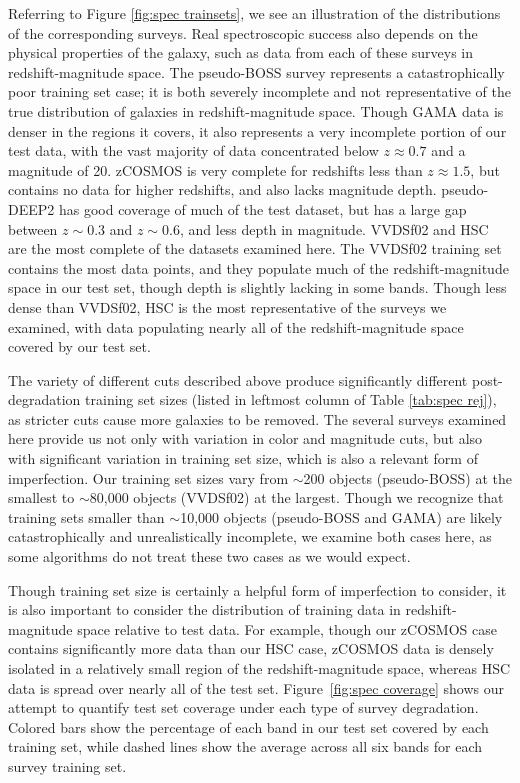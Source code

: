 \documentclass[fleqn,usenatbib,useAMS]{mnras}
\newcommand{\PersonalTag}[3]{{\color{#2}{$^{#1}$ [#3}]}}
\newcommand{\aim}[1]{\PersonalTag{Alex}{violet}{#1}}
\begin{document}
Referring to Figure \ref{fig:spec trainsets}, we see an illustration of the distributions of the corresponding surveys. Real spectroscopic success also depends on the physical properties of the galaxy, such as data from each of these surveys in redshift-magnitude space. The pseudo-BOSS survey represents a catastrophically poor training set case; it is both severely incomplete and not representative of the true distribution of galaxies in redshift-magnitude space. Though GAMA data is denser in the regions it covers, it also represents a very incomplete portion of our test data, with the vast majority of data concentrated below $z\approx0.7$ and a magnitude of 20. zCOSMOS is very complete for redshifts less than $z\approx1.5$, but contains no data for higher redshifts, and also lacks magnitude depth. pseudo-DEEP2 has good coverage of much of the test dataset, but has a large gap between $z\sim0.3$ and $z\sim0.6$, and less depth in magnitude. VVDSf02 and HSC are the most complete of the datasets examined here. The VVDSf02 training set contains the most data points, and they populate much of the redshift-magnitude space in our test set, though depth is slightly lacking in some bands. Though less dense than VVDSf02, HSC is the most representative of the surveys we examined, with data populating nearly all of the redshift-magnitude space covered by our test set.

The variety of different cuts described above produce significantly different post-degradation training set sizes (listed in leftmost column of Table \ref{tab:spec rej}), as stricter cuts cause more galaxies to be removed. The several surveys examined here provide us not only with variation in color and magnitude cuts, but also with significant variation in training set size, which is also a relevant form of imperfection. Our training set sizes vary from $\sim$200 objects (pseudo-BOSS) at the smallest to $\sim$80,000 objects (VVDSf02) at the largest. Though we recognize that training sets smaller than $\sim$10,000 objects (pseudo-BOSS and GAMA) are likely catastrophically and unrealistically incomplete, we examine both cases here, as some algorithms do not treat these two cases as we would expect. 

Though training set size is certainly a helpful form of imperfection to consider, it is also important to consider the distribution of training data in redshift-magnitude space relative to test data. For example, though our zCOSMOS case contains significantly more data than our HSC case, zCOSMOS data is densely isolated in a relatively small region of the redshift-magnitude space, whereas HSC data is spread over nearly all of the test set. 
Figure~\ref{fig:spec coverage} shows our attempt to quantify test set coverage under each type of survey degradation. Colored bars show the percentage of each band in our test set covered by each training set, while dashed lines show the average across all six bands for each survey training set. 
\end{document}
